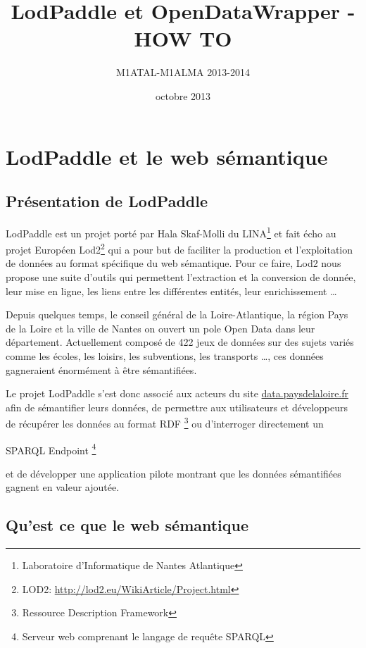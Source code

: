 \documentclass[a4paper]{article}
\title{LodPaddle et OpenDataWrapper - HOW TO}
\author{M1ATAL-M1ALMA 2013-2014}
\date{octobre 2013}
\begin{document}
\maketitle
\newpage

\tableofcontents %
\newpage

\section{LodPaddle et le web sémantique}
\subsection{Présentation de LodPaddle}

LodPaddle est un projet porté par Hala Skaf-Molli du LINA\footnote{Laboratoire
d'Informatique de Nantes Atlantique} et fait écho au projet Européen
Lod2\footnote{LOD2:
\href{http://lod2.eu/WikiArticle/Project.html}{http://lod2.eu/WikiArticle/Project.html}}
qui a pour but de faciliter la production et l'exploitation de données au format
spécifique du web sémantique. Pour ce faire, Lod2 nous propose une suite
d'outils qui permettent l'extraction et la conversion de donnée, leur mise en
ligne, les liens entre les différentes entités, leur enrichissement \ldots{}

Depuis quelques temps, le conseil général de la Loire-Atlantique, la région Pays
de la Loire et la ville de Nantes on ouvert un pole Open Data dans leur
département. Actuellement composé de 422 jeux de données sur des sujets variés
comme les écoles, les loisirs, les subventions, les transports \ldots{}, ces
données gagneraient énormément à être sémantifiées.

Le projet LodPaddle s'est donc associé aux acteurs du site
\href{http://data.paysdelaloire.fr}{data.paysdelaloire.fr} afin de sémantifier
leurs données, de permettre aux utilisateurs et développeurs de récupérer les
données au format RDF \footnote{Ressource Description Framework} ou d'interroger
directement un \begin{itshape}SPARQL Endpoint \footnote{Serveur web comprenant
le langage de requête SPARQL}\end{itshape} et de développer une application
pilote montrant que les données sémantifiées gagnent en valeur ajoutée.

\subsection{Qu'est ce que le web sémantique}
\end{document}

